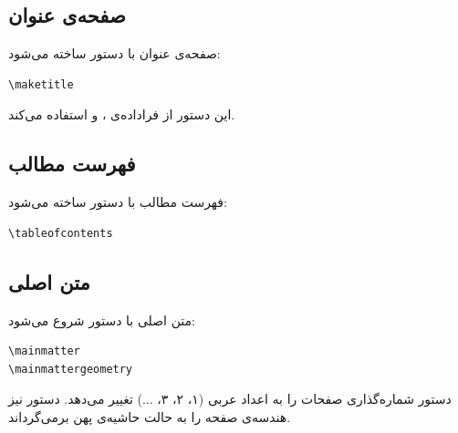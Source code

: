 
\subsection{صفحه‌ی عنوان}
\label{sec:first-book-titlepage}

صفحه‌ی عنوان با دستور  ساخته می‌شود:

\begin{latin}
\begin{verbatim}
\maketitle
\end{verbatim}
\end{latin}

این دستور از فراداده‌ی ،  و
 استفاده می‌کند.

\subsection{فهرست مطالب}
\label{sec:first-book-toc}

فهرست مطالب با دستور  ساخته
می‌شود:

\begin{latin}
\begin{verbatim}
\tableofcontents
\end{verbatim}
\end{latin}


\subsection{متن اصلی}
\label{sec:first-book-mainmatter}

متن اصلی با دستور  شروع می‌شود:

\begin{latin}
\begin{verbatim}
\mainmatter
\mainmattergeometry
\end{verbatim}
\end{latin}

دستور  شماره‌گذاری صفحات را به
اعداد عربی (۱، ۲، ۳، ...) تغییر می‌دهد.
دستور  نیز هندسه‌ی
صفحه را به حالت حاشیه‌ی پهن برمی‌گرداند.

